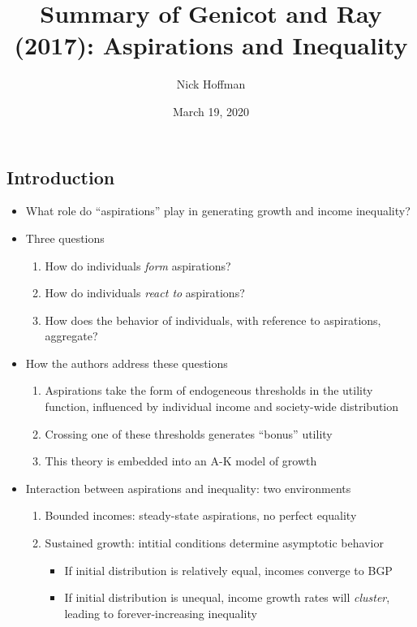 \documentclass[]{article}
\title{Summary of Genicot and Ray (2017): Aspirations and Inequality}
\author{Nick Hoffman}
\date{March 19, 2020}
\providecommand{\tightlist}{%
  \setlength{\itemsep}{0pt}\setlength{\parskip}{0pt}}
\begin{document}
\maketitle

\subsection{Introduction}\label{introduction}

\begin{itemize}
\tightlist
\item
  What role do ``aspirations'' play in generating growth and income
  inequality?
\item
  Three questions

  \begin{enumerate}
  \def\labelenumi{\arabic{enumi}.}
  \tightlist
  \item
    How do individuals \emph{form} aspirations?
  \item
    How do individuals \emph{react to} aspirations?
  \item
    How does the behavior of individuals, with reference to aspirations,
    aggregate?
  \end{enumerate}
\item
  How the authors address these questions

  \begin{enumerate}
  \def\labelenumi{\arabic{enumi}.}
  \tightlist
  \item
    Aspirations take the form of endogeneous thresholds in the utility
    function, influenced by individual income and society-wide
    distribution
  \item
    Crossing one of these thresholds generates ``bonus'' utility
  \item
    This theory is embedded into an A-K model of growth
  \end{enumerate}
\item
  Interaction between aspirations and inequality: two environments

  \begin{enumerate}
  \def\labelenumi{\arabic{enumi}.}
  \tightlist
  \item
    Bounded incomes: steady-state aspirations, no perfect equality
  \item
    Sustained growth: intitial conditions determine asymptotic behavior

    \begin{itemize}
    \tightlist
    \item
      If initial distribution is relatively equal, incomes converge to
      BGP
    \item
      If initial distribution is unequal, income growth rates will
      \emph{cluster}, leading to forever-increasing inequality
    \end{itemize}
  \end{enumerate}
\end{itemize}
\end{document}
